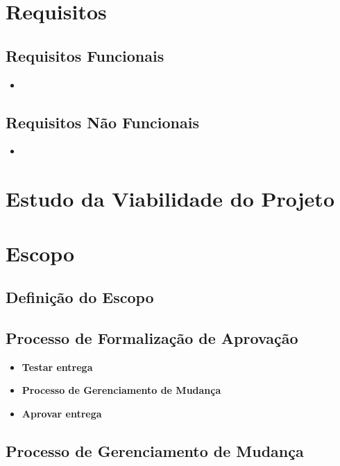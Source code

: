 \section{Requisitos}
\label{sec:requisitos}
\subsection{Requisitos Funcionais}

\begin{itemize}
\item 
\end{itemize}

\subsection{Requisitos Não Funcionais}

\begin{itemize}
\item
\end{itemize}

\section{Estudo da Viabilidade do Projeto}

\section{Escopo}
\subsection{Definição do Escopo}

\subsection{Processo de Formalização de Aprovação}

\begin{itemize}
\item \textbf{Testar entrega}

\item \textbf{Processo de Gerenciamento de Mudança}

\item \textbf{Aprovar entrega} 
\end{itemize}

\subsection{Processo de Gerenciamento de Mudança}
 
